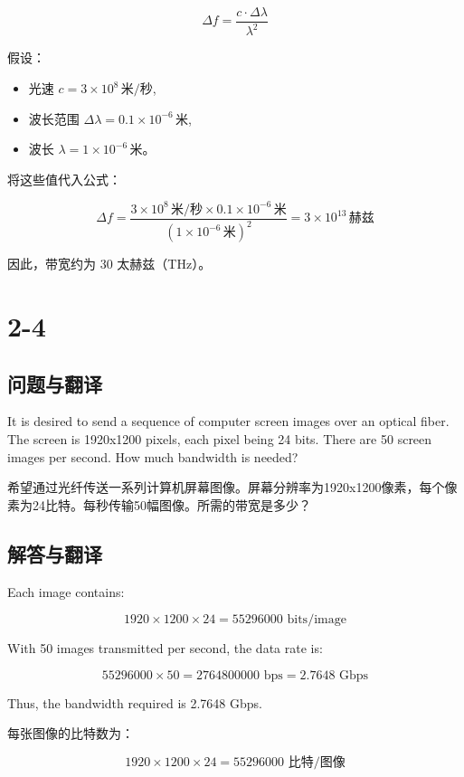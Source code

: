\[
\Delta f = \frac{c \cdot \Delta \lambda}{\lambda^2}
\]

假设：
\begin{itemize}
    \item 光速 \(c = 3 \times 10^8 \, \text{米/秒}\),
    \item 波长范围 \(\Delta \lambda = 0.1 \times 10^{-6} \, \text{米}\),
    \item 波长 \(\lambda = 1 \times 10^{-6} \, \text{米}\)。
\end{itemize}

将这些值代入公式：

\[
\Delta f = \frac{3 \times 10^8 \, \text{米/秒} \times 0.1 \times 10^{-6} \, \text{米}}{(1 \times 10^{-6} \, \text{米})^2} = 3 \times 10^{13} \, \text{赫兹}
\]

因此，带宽约为 30 太赫兹（THz）。

\section{2-4}

\subsection{问题与翻译}

It is desired to send a sequence of computer screen images over an optical fiber. The screen is 1920x1200 pixels, each pixel being 24 bits. There are 50 screen images per second. How much bandwidth is needed?

希望通过光纤传送一系列计算机屏幕图像。屏幕分辨率为1920x1200像素，每个像素为24比特。每秒传输50幅图像。所需的带宽是多少？

\subsection{解答与翻译}

Each image contains:

\[
1920 \times 1200 \times 24 = 55296000 \text{ bits/image}
\]

With 50 images transmitted per second, the data rate is:

\[
55296000 \times 50 = 2764800000 \text{ bps} = 2.7648 \text{ Gbps}
\]

Thus, the bandwidth required is 2.7648 Gbps.

\vspace{10pt}

每张图像的比特数为：

\[
1920 \times 1200 \times 24 = 55296000 \text{ 比特/图像}
\]

